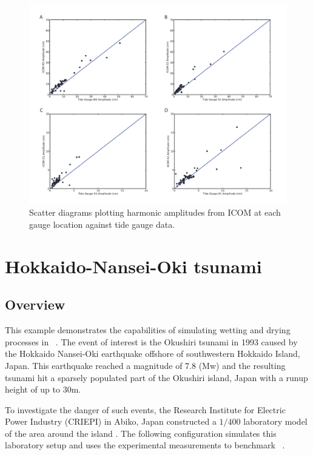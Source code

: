 \begin{figure}[t]
\centering
\includegraphics[width=\textwidth]{./examples_images/tides_in_the_Mediterranean_Sea/plots}
\caption{Scatter diagrams plotting harmonic amplitudes from ICOM at each gauge location against tide gauge data.} 
\label{plots}
\end{figure}



\section{Hokkaido-Nansei-Oki tsunami}
\label{sect:hokkaido-nansei-oki_tsunami}

\subsection{Overview}
This example demonstrates the capabilities of simulating wetting and drying processes in \fluidity\ .
The event of interest is the Okushiri tsunami in 1993 caused by the Hokkaido Nansei-Oki earthquake offshore of southwestern Hokkaido Island, Japan. 
This earthquake reached a magnitude of 7.8 (Mw) and the resulting tsunami hit a sparsely populated part of the Okushiri island, Japan with a runup height of up to 30m.

To investigate the danger of such events, the Research Institute for Electric Power Industry (CRIEPI) in Abiko, Japan constructed a $1/400$ laboratory model of the area around the island \cite{liu2008advanced}. 
The following configuration simulates this laboratory setup and uses the experimental measurements to benchmark \fluidity\ .

